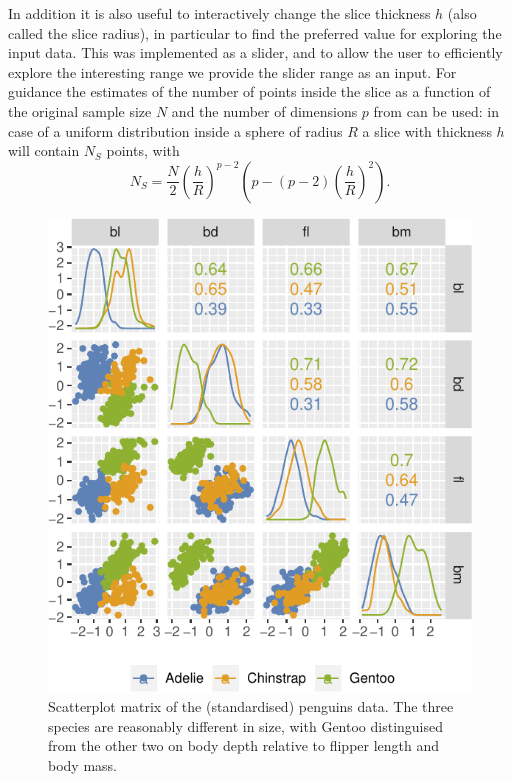 \documentclass[]{interact}
\theoremstyle{plain}%
\theoremstyle{definition}
\theoremstyle{remark}
\begin{document}
In addition it is also useful to interactively change the slice
thickness \(h\) (also called the slice radius), in particular to find
the preferred value for exploring the input data. This was implemented
as a slider, and to allow the user to efficiently explore the
interesting range we provide the slider range as an input. For guidance
the estimates of the number of points inside the slice as a function of
the original sample size \(N\) and the number of dimensions \(p\) from
\citet{sectionpursuit} can be used: in case of a uniform distribution
inside a sphere of radius \(R\) a slice with thickness \(h\) will
contain \(N_S\) points, with \begin{equation}
N_S = \frac{N}{2} \left(\frac{h}{R}\right)^{p-2} \left(p - (p-2)\left(\frac{h}{R}\right)^{2}\right).
\label{eq:count}
\end{equation}

\begin{figure}

{\centering \includegraphics[width=0.8\linewidth]{paper_files/figure-latex/penguins-scatmat-1} 

}

\caption{Scatterplot matrix of the (standardised) penguins data. The three species are reasonably different in size, with Gentoo distinguised from the other two on body depth relative to flipper length and body mass.}\label{fig:penguins-scatmat}
\end{figure}
\end{document}
